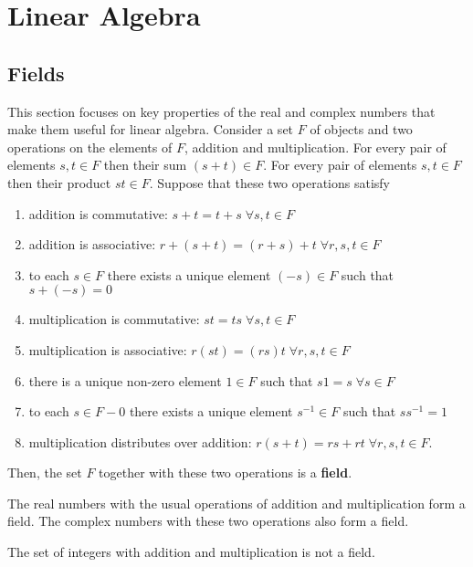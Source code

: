 \chapter{Linear Algebra}


\section{Fields}

This section focuses on key properties of the real and complex numbers that make them useful for linear algebra.
Consider a set $F$ of objects and two operations on the elements of $F$, addition and multiplication.
For every pair of elements $s, t \in F$ then their sum $(s + t) \in F$.
For every pair of elements $s, t \in F$ then their product $st \in F$.
Suppose that these two operations satisfy
\begin{enumerate}
\item addition is commutative: $s + t = t + s \; \forall s, t \in F$
\item addition is associative: $r + (s + t) = (r + s) + t \; \forall r, s, t \in F$
\item to each $s \in F$ there exists a unique element $(-s) \in F$ such that $s + (-s) = 0$
\item multiplication is commutative: $st = ts \; \forall s,t \in F$
\item multiplication is associative: $r(st) = (rs)t \; \forall r, s, t \in F$
\item there is a unique non-zero element $1 \in F$ such that $s1 = s \; \forall s \in F$
\item to each $s \in F - 0$ there exists a unique element $s^{-1} \in F$ such that $s s^{-1} = 1$
\item multiplication distributes over addition: $r (s + t) = rs + rt \; \forall r, s, t \in F$.
\end{enumerate}
Then, the set $F$ together with these two operations is a \textbf{field}.

\begin{example}
The real numbers with the usual operations of addition and multiplication form a field.
The complex numbers with these two operations also form a field.
\end{example}

\begin{example}
The set of integers with addition and multiplication is not a field.
\end{example}

